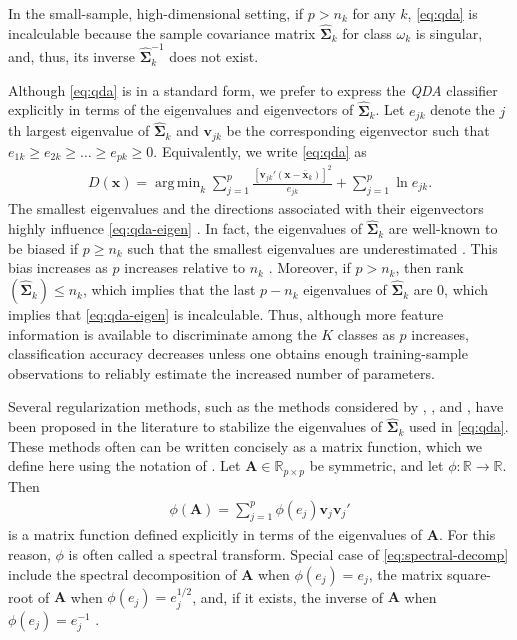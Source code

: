 \documentclass[11pt]{article}
\newcommand{\xbar}{\bar{\bm x}}
\DeclareMathOperator*{\argmin}{arg\,min}
\begin{document}
In the small-sample, high-dimensional setting, if $p > n_k$ for any $k$, \eqref{eq:qda} is incalculable because the sample covariance matrix $\widehat{\bm\Sigma}_k$ for class $\omega_k$ is singular, and, thus, its inverse $\widehat{\bm\Sigma}_k^{-1}$ does not exist.


Although \eqref{eq:qda} is in a standard form, we prefer to express the \emph{QDA} classifier explicitly in terms of the eigenvalues and eigenvectors of $\widehat{\bm \Sigma}_k$. Let $e_{jk}$ denote the $j$th largest eigenvalue of $\widehat{\bm\Sigma}_k$ and $\bm v_{jk}$ be the corresponding eigenvector such that $e_{1k} \ge e_{2k} \ge \ldots \ge e_{pk} \ge 0$. Equivalently, we write \eqref{eq:qda} as
\begin{align}
  D(\bm x) = \argmin_{k} \sum_{j = 1}^p \frac{[\bm v_{jk}' (\bm x - \bm \xbar_k)]^2}{e_{jk}} + \sum_{j=1}^p \ln e_{jk}. \label{eq:qda-eigen}
\end{align}
The smallest eigenvalues and the directions associated with their eigenvectors highly influence \eqref{eq:qda-eigen} . In fact, the eigenvalues of $\widehat{\bm \Sigma}_k$ are well-known to be biased if $p \ge n_k$ such that the smallest eigenvalues are underestimated \citep{Seber:2004uh}. This bias increases as $p$ increases relative to $n_k$ \citep{TODONeedCitation}. Moreover, if $p > n_k$, then rank$(\widehat{\bm \Sigma}_k) \le n_k$, which implies that the last $p - n_k$ eigenvalues of $\widehat{\bm \Sigma}_k$ are 0, which implies that \eqref{eq:qda-eigen} is incalculable. Thus, although more feature information is available to discriminate among the $K$ classes as $p$ increases, classification accuracy decreases unless one obtains enough training-sample observations to reliably estimate the increased number of parameters.

Several regularization methods, such as the methods considered by \citet*{Guo:2007te}, \cite{Mkhadri:1995jp}, and \citet*{Xu:2009fl}, have been proposed in the literature to stabilize the eigenvalues of $\widehat{\bm \Sigma}_k$ used in \eqref{eq:qda}. These methods often can be written concisely as a matrix function, which we define here using the notation of \cite{Izenman:2008gm}. Let $\bm A \in \mathbb{R}_{p \times p}$ be symmetric, and let $\phi:\mathbb{R} \rightarrow \mathbb{R}$. Then
\begin{align}
	\phi(\bm A) = \sum_{j = 1}^p \phi(e_j) \bm v_j \bm v_j'\label{eq:spectral-decomp}
\end{align}
is a matrix function defined explicitly in terms of the eigenvalues of $\bm A$. For this reason, $\phi$ is often called a spectral transform. Special case of \eqref{eq:spectral-decomp} include the spectral decomposition of $\bm A$ when $\phi(e_j) = e_j$, the matrix square-root of $\bm A$ when $\phi(e_j) = e_j^{1/2}$, and, if it exists, the inverse of $\bm A$ when $\phi(e_j) = e_j^{-1}$ \citep{Harville:2008wja}.
\end{document}

